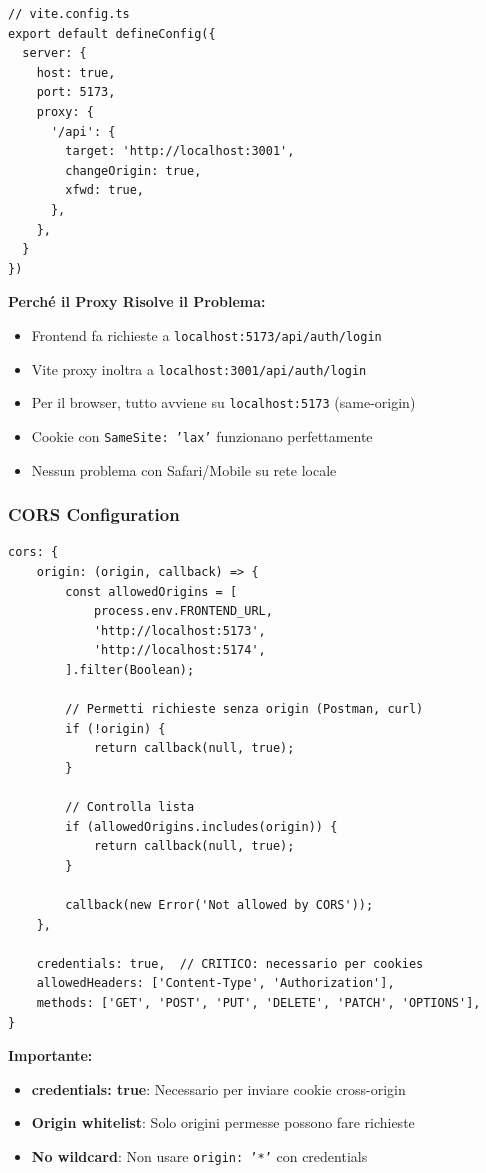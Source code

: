 \documentclass[11pt,a4paper]{article}
\newcommand{\code}[1]{\texttt{#1}}
\begin{document}
\begin{lstlisting}[caption=Vite Proxy Configuration]
// vite.config.ts
export default defineConfig({
  server: {
    host: true,
    port: 5173,
    proxy: {
      '/api': {
        target: 'http://localhost:3001',
        changeOrigin: true,
        xfwd: true,
      },
    },
  }
})
\end{lstlisting}

\textbf{Perché il Proxy Risolve il Problema:}
\begin{itemize}
    \item Frontend fa richieste a \code{localhost:5173/api/auth/login}
    \item Vite proxy inoltra a \code{localhost:3001/api/auth/login}
    \item Per il browser, tutto avviene su \code{localhost:5173} (same-origin)
    \item Cookie con \code{SameSite: 'lax'} funzionano perfettamente
    \item Nessun problema con Safari/Mobile su rete locale
\end{itemize}

\subsubsection{CORS Configuration}

\begin{lstlisting}[caption=Configurazione CORS]
cors: {
    origin: (origin, callback) => {
        const allowedOrigins = [
            process.env.FRONTEND_URL,
            'http://localhost:5173',
            'http://localhost:5174',
        ].filter(Boolean);
        
        // Permetti richieste senza origin (Postman, curl)
        if (!origin) {
            return callback(null, true);
        }
        
        // Controlla lista
        if (allowedOrigins.includes(origin)) {
            return callback(null, true);
        }
        
        callback(new Error('Not allowed by CORS'));
    },
    
    credentials: true,  // CRITICO: necessario per cookies
    allowedHeaders: ['Content-Type', 'Authorization'],
    methods: ['GET', 'POST', 'PUT', 'DELETE', 'PATCH', 'OPTIONS'],
}
\end{lstlisting}

\textbf{Importante:}
\begin{itemize}
    \item \textbf{credentials: true}: Necessario per inviare cookie cross-origin
    \item \textbf{Origin whitelist}: Solo origini permesse possono fare richieste
    \item \textbf{No wildcard}: Non usare \code{origin: '*'} con credentials
\end{itemize}
\end{document}
